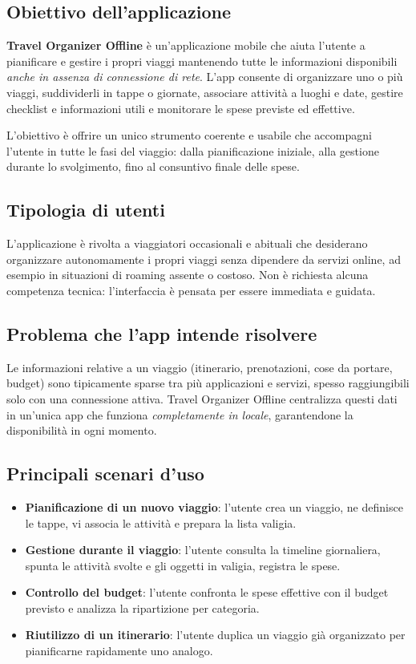 \documentclass[11pt, a4paper]{article}
\begin{document}
\subsection{Obiettivo dell'applicazione}
\textbf{Travel Organizer Offline} è un'applicazione mobile che aiuta l'utente a
pianificare e gestire i propri viaggi mantenendo tutte le informazioni disponibili
\emph{anche in assenza di connessione di rete}. L'app consente di organizzare uno o
più viaggi, suddividerli in tappe o giornate, associare attività a luoghi e date,
gestire checklist e informazioni utili e monitorare le spese previste ed effettive.

L'obiettivo è offrire un unico strumento coerente e usabile che accompagni l'utente
in tutte le fasi del viaggio: dalla pianificazione iniziale, alla gestione durante lo
svolgimento, fino al consuntivo finale delle spese.

\subsection{Tipologia di utenti}
L'applicazione è rivolta a viaggiatori occasionali e abituali che desiderano
organizzare autonomamente i propri viaggi senza dipendere da servizi online, ad
esempio in situazioni di roaming assente o costoso. Non è richiesta alcuna competenza
tecnica: l'interfaccia è pensata per essere immediata e guidata.

\subsection{Problema che l'app intende risolvere}
Le informazioni relative a un viaggio (itinerario, prenotazioni, cose da portare,
budget) sono tipicamente sparse tra più applicazioni e servizi, spesso raggiungibili
solo con una connessione attiva. Travel Organizer Offline centralizza questi dati in
un'unica app che funziona \emph{completamente in locale}, garantendone la disponibilità
in ogni momento.

\subsection{Principali scenari d'uso}
\begin{itemize}[nosep]
    \item \textbf{Pianificazione di un nuovo viaggio}: l'utente crea un viaggio, ne
    definisce le tappe, vi associa le attività e prepara la lista valigia.
    \item \textbf{Gestione durante il viaggio}: l'utente consulta la timeline
    giornaliera, spunta le attività svolte e gli oggetti in valigia, registra le spese.
    \item \textbf{Controllo del budget}: l'utente confronta le spese effettive con il
    budget previsto e analizza la ripartizione per categoria.
    \item \textbf{Riutilizzo di un itinerario}: l'utente duplica un viaggio già
    organizzato per pianificarne rapidamente uno analogo.
\end{itemize}
\end{document}
